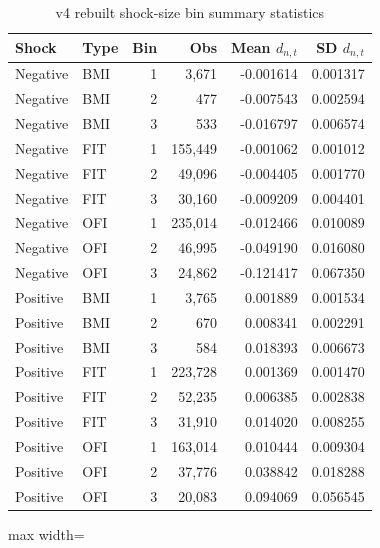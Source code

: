 \documentclass[11pt]{article}
\begin{document}
\begin{table}[H]
\centering
\caption{v4 rebuilt shock-size bin summary statistics}
\label{tab:v4_bin_summary}
\begin{tabular}{llrrrr}
\toprule
Shock & Type & Bin & Obs & Mean $d_{n,t}$ & SD $d_{n,t}$ \\
\midrule
Negative & BMI & 1 & 3,671 & -0.001614 & 0.001317 \\
Negative & BMI & 2 & 477 & -0.007543 & 0.002594 \\
Negative & BMI & 3 & 533 & -0.016797 & 0.006574 \\
Negative & FIT & 1 & 155,449 & -0.001062 & 0.001012 \\
Negative & FIT & 2 & 49,096 & -0.004405 & 0.001770 \\
Negative & FIT & 3 & 30,160 & -0.009209 & 0.004401 \\
Negative & OFI & 1 & 235,014 & -0.012466 & 0.010089 \\
Negative & OFI & 2 & 46,995 & -0.049190 & 0.016080 \\
Negative & OFI & 3 & 24,862 & -0.121417 & 0.067350 \\
\addlinespace
Positive & BMI & 1 & 3,765 & 0.001889 & 0.001534 \\
Positive & BMI & 2 & 670 & 0.008341 & 0.002291 \\
Positive & BMI & 3 & 584 & 0.018393 & 0.006673 \\
Positive & FIT & 1 & 223,728 & 0.001369 & 0.001470 \\
Positive & FIT & 2 & 52,235 & 0.006385 & 0.002838 \\
Positive & FIT & 3 & 31,910 & 0.014020 & 0.008255 \\
Positive & OFI & 1 & 163,014 & 0.010444 & 0.009304 \\
Positive & OFI & 2 & 37,776 & 0.038842 & 0.018288 \\
Positive & OFI & 3 & 20,083 & 0.094069 & 0.056545 \\
\bottomrule
\end{tabular}
\end{table}

\begin{table}[H]
\centering
\caption{v4 rebuilt-bin pooled asymmetric multipliers by shock-size bin}
\label{tab:v4_asym_multipliers}
\begin{adjustbox}{max width=\textwidth}
\begingroup
\renewcommand{\vspace}[1]{}

\endgroup
\end{adjustbox}
\end{table}
\end{document}
